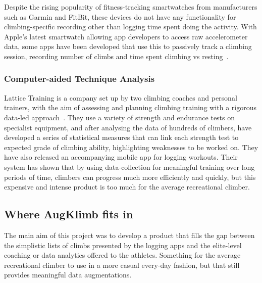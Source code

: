 Despite the rising popularity of fitness-tracking smartwatches from manufacturers such as Garmin and FitBit, these devices do not have any functionality for climbing-specific recording other than logging time spent doing the activity.
With Apple's latest smartwatch allowing app developers to access raw accelerometer data, some apps have been developed that use this to passively track a climbing session, recording number of climbs and time spent climbing vs resting~\cite{chalkprint}.

\subsubsection{Computer-aided Technique Analysis}
Lattice Training is a company set up by two climbing coaches and personal trainers, with the aim of assessing and planning climbing training with a rigorous data-led approach~\cite{lattice}.
They use a variety of strength and endurance tests on specialist equipment, and after analysing the data of hundreds of climbers, have developed a series of statistical measures that can link each strength test to expected grade of climbing ability, highlighting weaknesses to be worked on.
They have also released an accompanying mobile app for logging workouts. 
Their system has shown that by using data-collection for meaningful training over long periods of time,  climbers can progress much more efficiently and quickly, but this expensive and intense product is too much for the average recreational climber.



\subsection{Where AugKlimb fits in}
The main aim of this project was to develop a product that fills the gap between the simplistic lists of climbs presented by the logging apps and the elite-level coaching or data analytics offered to the athletes.
Something for the average recreational climber to use in a more casual every-day fashion, but that still provides meaningful data augmentations.










